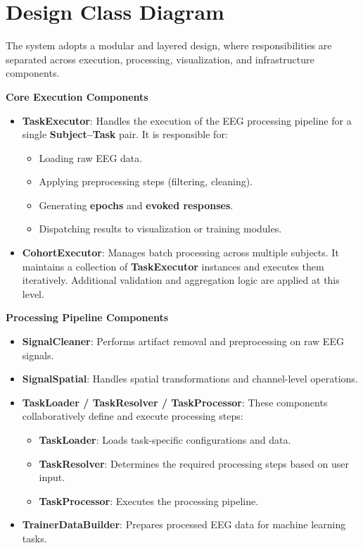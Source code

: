 \section{Design Class Diagram}
\label{sec:design-class-diagram}

The system adopts a modular and layered design, where responsibilities are separated across execution, processing, visualization, and infrastructure components.

\noindent\textbf{Core Execution Components}
\begin{itemize}
    \item \textbf{TaskExecutor}: Handles the execution of the EEG processing pipeline for a single \textbf{Subject--Task} pair. It is responsible for:
    \begin{itemize}
        \item Loading raw EEG data.
        \item Applying preprocessing steps (filtering, cleaning).
        \item Generating \textbf{epochs} and \textbf{evoked responses}.
        \item Dispatching results to visualization or training modules.
    \end{itemize}
    \item \textbf{CohortExecutor}: Manages batch processing across multiple subjects. It maintains a collection of \textbf{TaskExecutor} instances and executes them iteratively. Additional validation and aggregation logic are applied at this level.
\end{itemize}

\noindent\textbf{Processing Pipeline Components}
\begin{itemize}
    \item \textbf{SignalCleaner}: Performs artifact removal and preprocessing on raw EEG signals.
    \item \textbf{SignalSpatial}: Handles spatial transformations and channel-level operations.
    \item \textbf{TaskLoader / TaskResolver / TaskProcessor}: These components collaboratively define and execute processing steps:
    \begin{itemize}
        \item \textbf{TaskLoader}: Loads task-specific configurations and data.
        \item \textbf{TaskResolver}: Determines the required processing steps based on user input.
        \item \textbf{TaskProcessor}: Executes the processing pipeline.
    \end{itemize}
    \item \textbf{TrainerDataBuilder}: Prepares processed EEG data for machine learning tasks.
\end{itemize}

